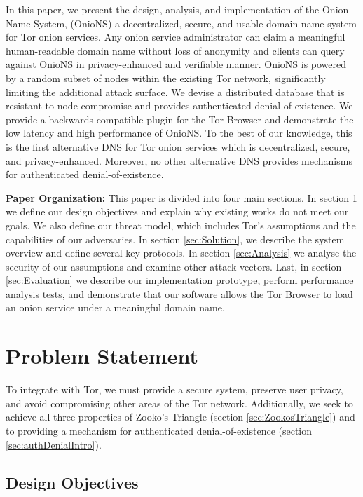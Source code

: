 \documentclass[USenglish,oneside,twocolumn]{article}
\begin{document}
In this paper, we present the design, analysis, and implementation of the Onion Name System, (OnioNS) a decentralized, secure, and usable domain name system for Tor onion services. Any onion service administrator can claim a meaningful human-readable domain name without loss of anonymity and clients can query against OnioNS in privacy-enhanced and verifiable manner. OnioNS is powered by a random subset of nodes within the existing Tor network, significantly limiting the additional attack surface. We devise a distributed database that is resistant to node compromise and provides authenticated denial-of-existence. We provide a backwards-compatible plugin for the Tor Browser and demonstrate the low latency and high performance of OnioNS. To the best of our knowledge, this is the first alternative DNS for Tor onion services which is decentralized, secure, and privacy-enhanced. Moreover, no other alternative DNS provides mechanisms for authenticated denial-of-existence.

\textbf{Paper Organization:} This paper is divided into four main sections. In section \ref{sec:problemStatement} we define our design objectives and explain why existing works do not meet our goals. We also define our threat model, which includes Tor's assumptions and the capabilities of our adversaries. In section \ref{sec:Solution}, we describe the system overview and define several key protocols. In section \ref{sec:Analysis} we analyse the security of our assumptions and examine other attack vectors. Last, in section \ref{sec:Evaluation} we describe our implementation prototype, perform performance analysis tests, and demonstrate that our software allows the Tor Browser to load an onion service under a meaningful domain name.

\section{Problem Statement}
\label{sec:problemStatement}

To integrate with Tor, we must provide a secure system, preserve user privacy, and avoid compromising other areas of the Tor network. Additionally, we seek to achieve all three properties of Zooko's Triangle (section \ref{sec:ZookosTriangle}) and to providing a mechanism for authenticated denial-of-existence (section \ref{sec:authDenialIntro}).

\subsection{Design Objectives}
\end{document}
